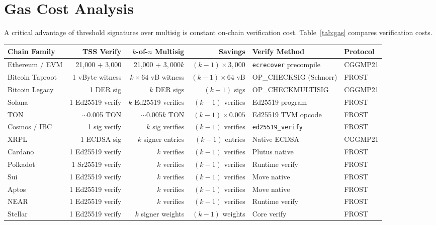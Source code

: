 \documentclass[11pt,twocolumn]{article}
\begin{document}
\section{Gas Cost Analysis}
\label{sec:gas}

A critical advantage of threshold signatures over multisig is constant on-chain
verification cost. Table~\ref{tab:gas} compares verification costs.

\begin{table}[t]
\centering
\small
\begin{tabular}{@{}lrrrll@{}}
\toprule
\textbf{Chain Family} & \textbf{TSS Verify} & \textbf{$k$-of-$n$ Multisig} & \textbf{Savings} & \textbf{Verify Method} & \textbf{Protocol} \\
\midrule
Ethereum / EVM & 21,000 + 3,000 & 21,000 + $3{,}000k$ & $(k{-}1) \times 3{,}000$ & \texttt{ecrecover} precompile & CGGMP21 \\
Bitcoin Taproot & 1 vByte witness & $k \times 64$ vB witness & $(k{-}1) \times 64$ vB & OP\_CHECKSIG (Schnorr) & FROST \\
Bitcoin Legacy & 1 DER sig & $k$ DER sigs & $(k{-}1)$ sigs & OP\_CHECKMULTISIG & CGGMP21 \\
Solana & 1 Ed25519 verify & $k$ Ed25519 verifies & $(k{-}1)$ verifies & Ed25519 program & FROST \\
TON & $\sim$0.005 TON & $\sim$0.005$k$ TON & $(k{-}1) \times 0.005$ & Ed25519 TVM opcode & FROST \\
Cosmos / IBC & 1 sig verify & $k$ sig verifies & $(k{-}1)$ verifies & \texttt{ed25519\_verify} & FROST \\
XRPL & 1 ECDSA sig & $k$ signer entries & $(k{-}1)$ entries & Native ECDSA & CGGMP21 \\
Cardano & 1 Ed25519 verify & $k$ verifies & $(k{-}1)$ verifies & Plutus native & FROST \\
Polkadot & 1 Sr25519 verify & $k$ verifies & $(k{-}1)$ verifies & Runtime verify & FROST \\
Sui & 1 Ed25519 verify & $k$ verifies & $(k{-}1)$ verifies & Move native & FROST \\
Aptos & 1 Ed25519 verify & $k$ verifies & $(k{-}1)$ verifies & Move native & FROST \\
NEAR & 1 Ed25519 verify & $k$ verifies & $(k{-}1)$ verifies & Runtime verify & FROST \\
Stellar & 1 Ed25519 verify & $k$ signer weights & $(k{-}1)$ weights & Core verify & FROST \\

\end{tabular}
\end{table}
\end{document}
